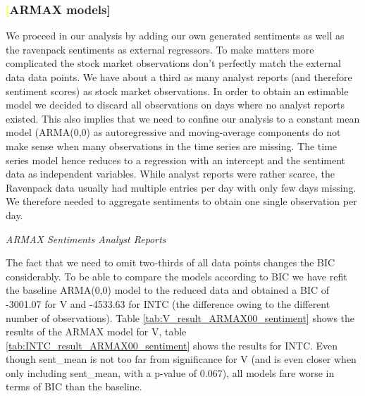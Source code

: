 \subsubsection{\textcolor{yellow}[ARMAX models]}
We proceed in our analysis by adding our own generated sentiments as well as the ravenpack sentiments as external regressors. To make matters more complicated the stock market observations don't perfectly match the external data data points. We have about a third as many analyst reports (and therefore sentiment scores) as stock market observations. In order to obtain an estimable model we decided to discard all observations on days where no analyst reports existed. This also implies that we need to confine our analysis to a constant mean model (ARMA(0,0) as autoregressive and moving-average components do not make sense when many observations in the time series are missing. The time series model hence reduces to a regression with an intercept and the sentiment data as independent variables. While analyst reports were rather scarce, the Ravenpack data usually had multiple entries per day with only few days missing. We therefore needed to aggregate sentiments to obtain one single observation per day. 


\textit{ARMAX Sentiments Analyst Reports}

The fact that we need to omit two-thirds of all data points changes the BIC considerably. To be able to compare the models according to BIC we have refit the baseline ARMA(0,0) model to the reduced data and obtained a BIC of -3001.07 for V and -4533.63 for INTC (the difference owing to the different number of observations). Table \ref{tab:V_result_ARMAX00_sentiment} shows the results of the ARMAX model for V, table \ref{tab:INTC_result_ARMAX00_sentiment} shows the results for INTC. Even though sent\_mean is not too far from significance for V (and is even closer when only including sent\_mean, with a p-value of 0.067), all models fare worse in terms of BIC than the baseline. 

\begin{table}[h]
    \centering
    
    \caption{}
    \label{tab:V_result_ARMAX00_sentiment}
\end{table}{}

\begin{table}[h!]
    \centering
    
    \caption{}
    \label{tab:INTC_result_ARMAX00_sentiment}
\end{table}{}

